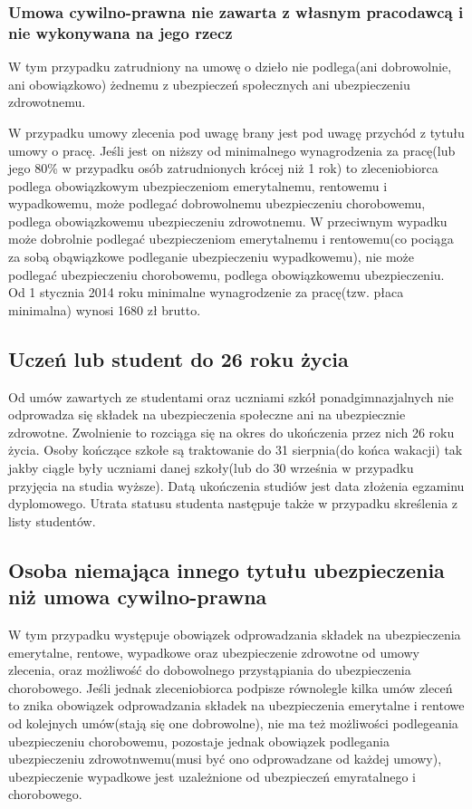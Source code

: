 \subsubsection{Umowa cywilno-prawna nie zawarta z własnym pracodawcą i nie wykonywana na jego rzecz}
W tym przypadku zatrudniony na umowę o dzieło nie podlega(ani dobrowolnie, ani obowiązkowo) żednemu z ubezpieczeń społecznych ani ubezpieczeniu zdrowotnemu. 

W przypadku umowy zlecenia pod uwagę brany jest pod uwagę przychód z tytułu umowy o pracę. Jeśli jest on niższy od minimalnego wynagrodzenia za pracę(lub jego 80\% w przypadku osób zatrudnionych krócej niż 1 rok) to zleceniobiorca podlega obowiązkowym ubezpieczeniom emerytalnemu, rentowemu i wypadkowemu, może podlegać dobrowolnemu ubezpieczeniu chorobowemu, podlega obowiązkowemu ubezpieczeniu zdrowotnemu. W przeciwnym wypadku może dobrolnie podlegać ubezpieczeniom emerytalnemu i rentowemu(co pociąga za sobą obąwiązkowe podleganie ubezpieczeniu wypadkowemu), nie może podlegać ubezpieczeniu chorobowemu, podlega obowiązkowemu ubezpieczeniu. Od 1 stycznia 2014 roku minimalne wynagrodzenie za pracę(tzw. płaca minimalna) wynosi 1680 zł brutto.

\subsection[Uczeń lub student do 26 roku życia][Uczeń lub student do 26 roku życia]{Uczeń lub student do 26 roku życia}
Od umów zawartych ze studentami oraz uczniami szkół ponadgimnazjalnych nie odprowadza się składek na ubezpieczenia społeczne ani na ubezpiecznie zdrowotne. Zwolnienie to rozciąga się na okres do ukończenia przez nich 26 roku życia. Osoby kończące szkołe są traktowanie do 31 sierpnia(do końca wakacji)  tak jakby ciągle były uczniami danej szkoły(lub do 30 września w przypadku przyjęcia na studia wyższe). Datą ukończenia studiów jest data złożenia egzaminu dyplomowego. Utrata statusu studenta następuje także w przypadku skreślenia z listy studentów.

\subsection[Osoba niemająca innego tytułu ubezpieczenia niż umowa cywilno-prawna][Osoba niemająca innego tytułu ubezpieczenia niż umowa cywilno-prawna]{Osoba niemająca innego tytułu ubezpieczenia niż umowa cywilno-prawna}
\label{inni}
W tym przypadku występuje obowiązek odprowadzania składek na ubezpieczenia emerytalne, rentowe, wypadkowe oraz ubezpieczenie zdrowotne od umowy zlecenia, oraz możliwość do dobowolnego przystąpiania do ubezpieczenia chorobowego. Jeśli jednak zleceniobiorca podpisze równolegle kilka umów zleceń to znika obowiązek odprowadzania składek na ubezpieczenia emerytalne i rentowe od kolejnych umów(stają się one dobrowolne), nie ma też możliwości podlegeania ubezpieczeniu chorobowemu, pozostaje jednak obowiązek podlegania ubezpieczeniu zdrowotnwemu(musi być ono odprowadzane od każdej umowy), ubezpieczenie wypadkowe jest uzależnione od ubezpieczeń emyratalnego i chorobowego.

